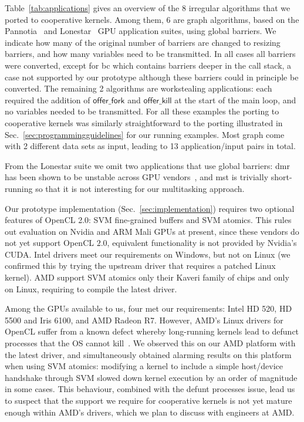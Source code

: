 \documentclass[numbers,nocopyrightspace,10pt]{sigplanconf}
\newcommand{\mytablong}{Table~}
\newcommand{\mysec}{Sec.~}
\newcommand{\nvidia}{Nvidia\xspace}
\newcommand{\offerfork}{\mathsf{offer\_fork}}
\newcommand{\offerkill}{\mathsf{offer\_kill}}
\begin{document}
\mytablong\ref{tab:applications} gives an overview of the 8 irregular
algorithms that we ported to cooperative kernels. Among them, 6 are
graph algorithms, based on the Pannotia~\cite{Pannotia} and
Lonestar~\cite{BNP12} GPU application suites, using global barriers.  We
indicate how many of the original number of barriers are changed to
resizing barriers, and how many variables need to be transmitted.  In
all cases all barriers were converted, except for bc which contains
barriers deeper in the call stack, a case not supported by our
prototype although these barriers could in principle be
converted. The remaining 2 algorithms are workstealing applications:
each required the addition of $\offerfork$ and $\offerkill$ at the start
of the main loop, and no variables needed to be transmitted.  For all
these examples the porting to cooperative kernels was similarly
straightforward to the porting illustrated in
\mysec\ref{sec:programmingguidelines} for our running examples. Most graph come with 2
different data sets as input, leading to 13 application/input pairs in
total.

From the Lonestar suite we omit two applications that use global barriers:
dmr has been shown to be unstable across GPU vendors~\cite{DBLP:conf/iwocl/SorensenD16}, and mst is trivially short-running so that it is not
interesting for our multitasking approach.

Our prototype implementation (\mysec\ref{sec:implementation}) requires
two optional features of OpenCL 2.0: SVM fine-grained buffers and SVM
atomics. This rules out evaluation on \nvidia and ARM Mali GPUs at
present, since these vendors do not yet support OpenCL $2.0$,
equivalent functionality is not provided by \nvidia's CUDA. Intel
drivers meet our requirements on Windows, but not on Linux (we
confirmed this by trying the upstream driver that requires a patched
Linux kernel). AMD support SVM atomics only their Kaveri family of
chips and only on Linux, requiring to compile the latest driver.

Among the GPUs available to us, four met our requirements: Intel HD 520,
HD 5500 and Iris 6100, and AMD Radeon R7.  However, AMD's Linux drivers
for OpenCL suffer from a known defect whereby long-running kernels lead
to defunct processes that the OS cannot
kill~\cite{amd-defunct-process}. We observed this on our AMD platform
with the latest driver, and simultaneously obtained alarming results on
this platform when using SVM atomics: modifying a kernel to include a
simple host/device handshake through SVM slowed down kernel execution by
an order of magnitude in some cases.  This behaviour, combined with the
defunt processes issue, lead us to suspect that the support we require
for cooperative kernels is not yet mature enough within AMD's drivers,
which we plan to discuss with engineers at AMD.
\end{document}
